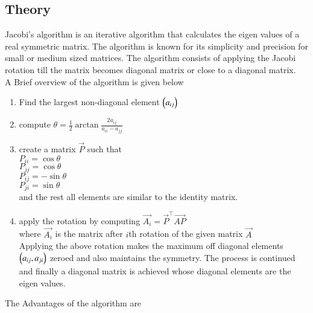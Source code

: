 \documentclass[journal,12pt,onecolumn]{IEEEtran}
\theoremstyle{remark}
\begin{document}
\subsection{\textbf{Theory}}
Jacobi's algorithm is an iterative algorithm that calculates the eigen values of a real symmetric matrix. The algorithm is known for its simplicity and precision  for small or medium sized matrices. The algorithm consists of applying the Jacobi rotation till the matrix becomes diagonal matrix or close to a diagonal matrix.\\
A Brief overview of the algorithm is given below\\
\begin{enumerate}
    \item Find the largest non-diagonal element $\left(a_{ij}\right)$
    \item compute $\theta=\frac{1}{2}\arctan{\frac{2a_{ij}}{a_{ii}-a_{jj}}}$
    \item create a matrix $\vec{P}$ such that\\
    $P_{ii}=\cos \theta$\\
    $P_{jj}=\cos \theta$\\
    $P_{ij}=-\sin \theta$\\
    $P_{ji}=\sin \theta$\\
    and the rest all elements are similar to the identity matrix.\\
    \item apply the rotation by computing $\vec{A_i}=\vec{P}^\top \vec{AP}$\\
    where $\vec{A_i}$ is the matrix after $i$th rotation of the given matrix $\vec{A}$\\
    Applying the above rotation makes the maximum off diagonal elements $\left(a_{ij},a_{ji}\right)$ zeroed and also maintains the symmetry. The process is continued and finally a diagonal matrix is achieved whose diagonal elements are the eigen values.\\
\end{enumerate}
The Advantages of the algorithm are \\
\end{document}
